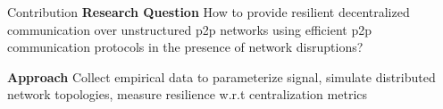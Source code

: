 \begin{frame}{Contribution}
    \textbf{Research Question} How to provide resilient decentralized communication over unstructured p2p networks using efficient p2p communication protocols in the presence of network disruptions?

    \textbf{Approach} Collect empirical data to parameterize signal, simulate distributed network topologies, measure resilience w.r.t centralization metrics
\end{frame}
